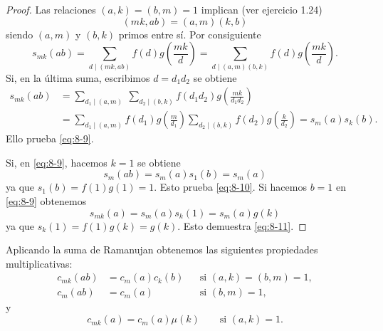 \documentclass[12pt,a4paper]{book}
\begin{document}
    \begin{proof}
        Las relaciones $(a,k)=(b,m)=1$ implican (ver ejercicio 1.24)
        \begin{equation*}
            (mk,ab)=(a,m)(k,b)
        \end{equation*}
        siendo $(a,m)$ y $(b,k)$ primos entre sí. Por consiguiente
        \begin{equation*}
            s_{mk}(ab)=\sum_{d\mid(mk,ab)}f(d)g\left(\frac{mk}{d}\right)
            =\sum_{d\mid(a,m)(b,k)}f(d)g\left(\frac{mk}{d}\right).
        \end{equation*}
        Si, en la última suma, escribimos $d=d_{1}d_{2}$ se obtiene
        \begin{align*}
            s_{mk}(ab)&=\sum_{d_{1}\mid(a,m)}\ \sum_{d_{2}\mid(b,k)}f(d_{1}d_{2})g\left(\frac{mk}{d_{1}d_{2}}\right)\\
            &=\sum_{d_{1}\mid(a,m)}f(d_{1})g\left(\frac{m}{d_{1}}\right)\sum_{d_{2}\mid(b,k)}f(d_{2})g\left(\frac{k}{d_{2}}\right)=s_{m}(a)s_{k}(b).
        \end{align*}
        Ello prueba \eqref{eq:8-9}.

        Si, en \eqref{eq:8-9}, hacemos $k=1$ se obtiene
        \begin{equation*}
            s_{m}(ab)=s_{m}(a)s_{1}(b)=s_{m}(a)
        \end{equation*}
        ya que $s_{1}(b)=f(1)g(1)=1$. Esto prueba \eqref{eq:8-10}. Si hacemos $b=1$ en
        \eqref{eq:8-9} obtenemos
        \begin{equation*}
            s_{mk}(a)=s_{m}(a)s_{k}(1)=s_{m}(a)g(k)
        \end{equation*}
        ya que $s_{k}(1)=f(1)g(k)=g(k)$. Esto demuestra \eqref{eq:8-11}.
    \end{proof}

    \begin{ejemplo}
        Aplicando la suma de Ramanujan obtenemos las siguientes propiedades multiplicativas:
        \begin{align*}
            c_{mk}(ab)&=c_{m}(a)c_{k}(b)&&\text{si }(a,k)=(b,m)=1,\\
            c_{m}(ab)&=c_{m}(a)&&\text{si }(b,m)=1,
        \end{align*}
        y
        \begin{equation*}
            c_{mk}(a)=c_{m}(a)\mu(k)\qquad\text{si }(a,k)=1.
        \end{equation*}
    \end{ejemplo}
\end{document}
